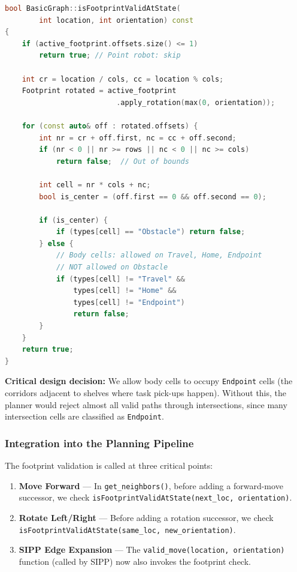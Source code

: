 \documentclass[12pt, a4paper]{article}
\begin{document}
\begin{lstlisting}[language=C++, caption={Patched collision check in \texttt{BasicGraph.cpp}}]
bool BasicGraph::isFootprintValidAtState(
        int location, int orientation) const
{
    if (active_footprint.offsets.size() <= 1)
        return true; // Point robot: skip

    int cr = location / cols, cc = location % cols;
    Footprint rotated = active_footprint
                          .apply_rotation(max(0, orientation));

    for (const auto& off : rotated.offsets) {
        int nr = cr + off.first, nc = cc + off.second;
        if (nr < 0 || nr >= rows || nc < 0 || nc >= cols)
            return false;  // Out of bounds

        int cell = nr * cols + nc;
        bool is_center = (off.first == 0 && off.second == 0);

        if (is_center) {
            if (types[cell] == "Obstacle") return false;
        } else {
            // Body cells: allowed on Travel, Home, Endpoint
            // NOT allowed on Obstacle
            if (types[cell] != "Travel" &&
                types[cell] != "Home" &&
                types[cell] != "Endpoint")
                return false;
        }
    }
    return true;
}
\end{lstlisting}

\textbf{Critical design decision:} We allow body cells to occupy \texttt{Endpoint} cells (the corridors adjacent to shelves where task pick-ups happen). Without this, the planner would reject almost all valid paths through intersections, since many intersection cells are classified as \texttt{Endpoint}.

\subsubsection{Integration into the Planning Pipeline}

The footprint validation is called at three critical points:

\begin{enumerate}
    \item \textbf{Move Forward} --- In \texttt{get\_neighbors()}, before adding a forward-move successor, we check \texttt{isFootprintValidAtState(next\_loc, orientation)}.

    \item \textbf{Rotate Left/Right} --- Before adding a rotation successor, we check \texttt{isFootprintValidAtState(same\_loc, new\_orientation)}.

    \item \textbf{SIPP Edge Expansion} --- The \texttt{valid\_move(location, orientation)} function (called by SIPP) now also invokes the footprint check.
\end{enumerate}
\end{document}
